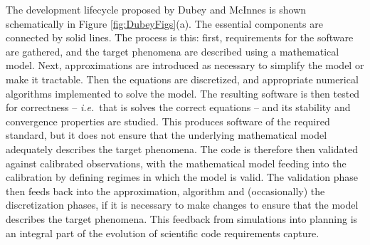 The development lifecycle proposed by Dubey and McInnes is shown schematically in
Figure \ref{fig:DubeyFigs}(a).
The essential components are connected by solid lines.
The process is this:
first, requirements for the software are gathered, and the target phenomena are
described using a mathematical model.
Next, approximations are introduced as necessary to simplify the model or make
it tractable.
Then the equations are discretized, and appropriate numerical algorithms
implemented to solve the model.
The resulting software is then tested for correctness -- \emph{i.e.}\ that is
solves the correct equations -- and its stability and convergence properties
are studied.
This produces software of the required standard, but it does not ensure that
the underlying mathematical model adequately describes the target phenomena.
The code is therefore then validated against calibrated observations, with the
mathematical model feeding into the calibration by defining regimes in which
the model is valid.
The validation phase then feeds back into the approximation, algorithm and
(occasionally) the discretization phases, if it is necessary to make changes
to ensure that the model describes the target phenomena.
This feedback from simulations into planning is an integral part of the
evolution of scientific code requirements capture.

